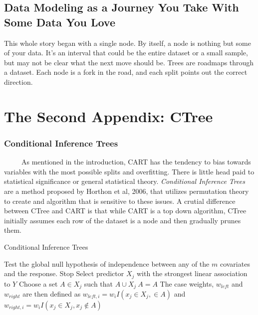 \documentclass[12pt,twoside]{reedthesis}
\begin{document}
  \section{Data Modeling as a Journey You Take With Some Data You
  Love}\label{data-modeling-as-a-journey-you-take-with-some-data-you-love}
  
  This whole story began with a single node. By itself, a node is nothing
  but some of your data. It's an interval that could be the entire dataset
  or a small sample, but may not be clear what the next move should be.
  Trees are roadmaps through a dataset. Each node is a fork in the road,
  and each split points out the correct direction.
  
  \chapter{The Second Appendix: CTree}\label{the-second-appendix-ctree}
  
  \subsection{Conditional Inference
  Trees}\label{conditional-inference-trees}
  
  ~~~~~As mentioned in the introduction, CART has the tendency to bias
  towards variables with the most possible splits and overfitting. There
  is little head paid to statistical significance or general statistical
  theory. \emph{Conditional Inference Trees} are a method proposed by
  Horthon et al, 2006, that utilizes permutation theory to create and
  algorithm that is sensitive to these issues. A crutial difference
  between CTree and CART is that while CART is a top down algorithm, CTree
  initially assumes each row of the dataset is a node and then gradually
  prunes them.
  
  \begin{algorithm}
  \caption{Conditional Inference Trees}
  \label{ctree}
  \begin{algorithmic}[1]
  \State Test the global null hypothesis of independence between any of the $m$ covariates and the response. 
  \State Stop 
  \Else \State Select predictor $X_j$ with the strongest linear association to $Y$ 
  \EndIf
  \State Choose a set $A \in X_j$ such that $A \cup X_j \ A = A$ 
  \State The case weights, $w_{left}$ and $w_{right}$ are then defined as $w_{left,i} = w_i I (x_j \in X_j, \in A)$ and $w_{right,i} = w_i I(x_j \in X_j, x_j \notin A)$
  \EndFor
  \end{algorithmic}
  \end{algorithm}
  
\end{document}

